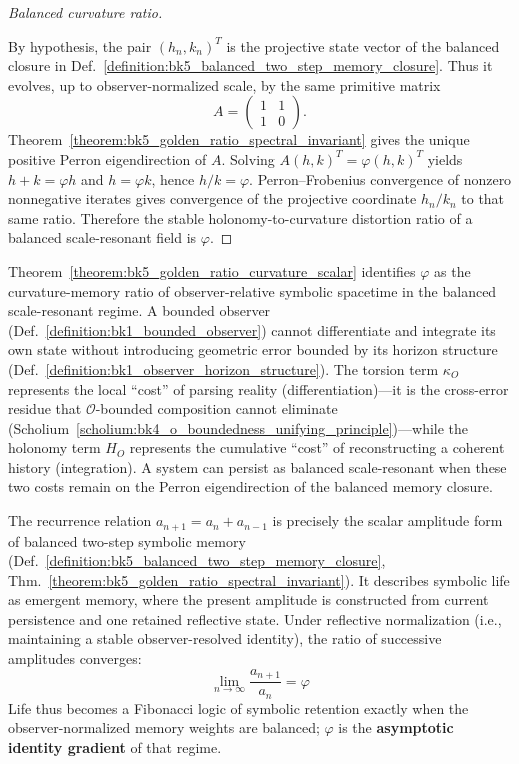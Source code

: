 \begin{proof}[Balanced curvature ratio]
\label{proof:bk5_golden_ratio_curvature_scalar}
\leavevmode

By hypothesis, the pair $(h_n,k_n)^T$ is the projective state vector of the
balanced closure in Def.~\ref{definition:bk5_balanced_two_step_memory_closure}.
Thus it evolves, up to observer-normalized scale, by the same primitive matrix
\[
A=\begin{pmatrix}1&1\\1&0\end{pmatrix}.
\]
Theorem~\ref{theorem:bk5_golden_ratio_spectral_invariant} gives the unique
positive Perron eigendirection of $A$.  Solving
$A(h,k)^T=\varphi(h,k)^T$ yields $h+k=\varphi h$ and
$h=\varphi k$, hence $h/k=\varphi$.  Perron--Frobenius convergence of
nonzero nonnegative iterates gives convergence of the projective coordinate
$h_n/k_n$ to that same ratio.  Therefore the stable holonomy-to-curvature
distortion ratio of a balanced scale-resonant field is $\varphi$.
\end{proof}

\begin{scholium}
\label{scholium:bk5_constant_of_becoming}
Theorem~\ref{theorem:bk5_golden_ratio_curvature_scalar} identifies $\varphi$ as the curvature-memory ratio of observer-relative symbolic spacetime in the balanced scale-resonant regime. A bounded observer (Def.~\ref{definition:bk1_bounded_observer}) cannot differentiate and integrate its own state without introducing geometric error bounded by its horizon structure (Def.~\ref{definition:bk1_observer_horizon_structure}). The torsion term $\kappa_O$ represents the local ``cost'' of parsing reality (differentiation)---it is the cross-error residue that $\mathcal{O}$-bounded composition cannot eliminate (Scholium~\ref{scholium:bk4_o_boundedness_unifying_principle})---while the holonomy term $H_O$ represents the cumulative ``cost'' of reconstructing a coherent history (integration). A system can persist as balanced scale-resonant when these two costs remain on the Perron eigendirection of the balanced memory closure.
\end{scholium}

\begin{remark}
\label{remark:bk5_symbolic_fibonacci_coding}
The recurrence relation $a_{n+1}=a_n+a_{n-1}$ is precisely the scalar amplitude
form of balanced two-step symbolic memory
(Def.~\ref{definition:bk5_balanced_two_step_memory_closure},
Thm.~\ref{theorem:bk5_golden_ratio_spectral_invariant}).  It describes symbolic
life as emergent memory, where the present amplitude is constructed from current
persistence and one retained reflective state.  Under reflective normalization
(i.e., maintaining a stable observer-resolved identity), the ratio of successive
amplitudes converges:
\[
\lim_{n \to \infty} \frac{a_{n+1}}{a_n} = \varphi
\]
Life thus becomes a Fibonacci logic of symbolic retention exactly when the
observer-normalized memory weights are balanced; $\varphi$ is the
\textbf{asymptotic identity gradient} of that regime.
\end{remark}

